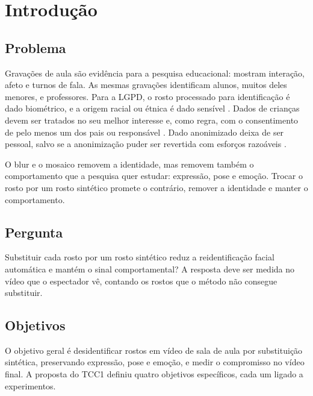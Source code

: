 \chapter{Introdução}
\label{cap:intro}


\section{Problema}

Gravações de aula são evidência para a pesquisa educacional: mostram interação, afeto e turnos de fala. As mesmas gravações identificam alunos, muitos deles menores, e professores. Para a LGPD, o rosto processado para identificação é dado biométrico, e a origem racial ou étnica é dado sensível \citep[art.~5, II; art.~11]{lgpd}. Dados de crianças devem ser tratados no seu melhor interesse e, como regra, com o consentimento de pelo menos um dos pais ou responsável \citep[art.~14]{lgpd}. Dado anonimizado deixa de ser pessoal, salvo se a anonimização puder ser revertida com esforços razoáveis \citep[art.~12]{lgpd}.

O blur e o mosaico removem a identidade, mas removem também o comportamento que a pesquisa quer estudar: expressão, pose e emoção. Trocar o rosto por um rosto sintético promete o contrário, remover a identidade e manter o comportamento.

\section{Pergunta}

Substituir cada rosto por um rosto sintético reduz a reidentificação facial automática e mantém o sinal comportamental? A resposta deve ser medida no vídeo que o espectador vê, contando os rostos que o método não consegue substituir.

\section{Objetivos}
\label{sec:objetivos}

O objetivo geral é desidentificar rostos em vídeo de sala de aula por substituição sintética, preservando expressão, pose e emoção, e medir o compromisso no vídeo final. A proposta do TCC1 definiu quatro objetivos específicos, cada um ligado a experimentos.

